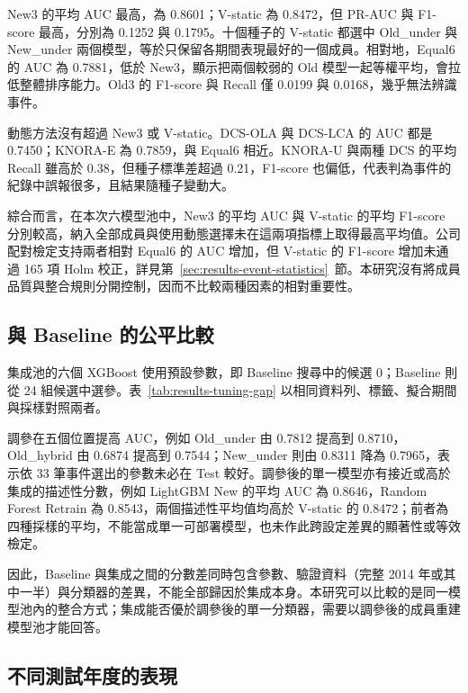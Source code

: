 New3 的平均 AUC 最高，為 0.8601；V-static 為 0.8472，但 PR-AUC 與 F1-score 最高，分別為 0.1252 與 0.1795。十個種子的 V-static 都選中 Old\_under 與 New\_under 兩個模型，等於只保留各期間表現最好的一個成員。相對地，Equal6 的 AUC 為 0.7881，低於 New3，顯示把兩個較弱的 Old 模型一起等權平均，會拉低整體排序能力。Old3 的 F1-score 與 Recall 僅 0.0199 與 0.0168，幾乎無法辨識事件。

動態方法沒有超過 New3 或 V-static。DCS-OLA 與 DCS-LCA 的 AUC 都是 0.7450；KNORA-E 為 0.7859，與 Equal6 相近。KNORA-U 與兩種 DCS 的平均 Recall 雖高於 0.38，但種子標準差超過 0.21，F1-score 也偏低，代表判為事件的紀錄中誤報很多，且結果隨種子變動大。

綜合而言，在本次六模型池中，New3 的平均 AUC 與 V-static 的平均 F1-score 分別較高，納入全部成員與使用動態選擇未在這兩項指標上取得最高平均值。公司配對檢定支持兩者相對 Equal6 的 AUC 增加，但 V-static 的 F1-score 增加未通過 165 項 Holm 校正，詳見第~\ref{sec:results-event-statistics}~節。本研究沒有將成員品質與整合規則分開控制，因而不比較兩種因素的相對重要性。

\subsection{與 Baseline 的公平比較}

集成池的六個 XGBoost 使用預設參數，即 Baseline 搜尋中的候選 0；Baseline 則從 24 組候選中選參。表~\ref{tab:results-tuning-gap} 以相同資料列、標籤、擬合期間與採樣對照兩者。



調參在五個位置提高 AUC，例如 Old\_under 由 0.7812 提高到 0.8710，Old\_hybrid 由 0.6874 提高到 0.7544；New\_under 則由 0.8311 降為 0.7965，表示依 33 筆事件選出的參數未必在 Test 較好。調參後的單一模型亦有接近或高於集成的描述性分數，例如 LightGBM New 的平均 AUC 為 0.8646，Random Forest Retrain 為 0.8543，兩個描述性平均值均高於 V-static 的 0.8472；前者為四種採樣的平均，不能當成單一可部署模型，也未作此跨設定差異的顯著性或等效檢定。

因此，Baseline 與集成之間的分數差同時包含參數、驗證資料（完整 2014 年或其中一半）與分類器的差異，不能全部歸因於集成本身。本研究可以比較的是同一模型池內的整合方式；集成能否優於調參後的單一分類器，需要以調參後的成員重建模型池才能回答。

\subsection{不同測試年度的表現}

